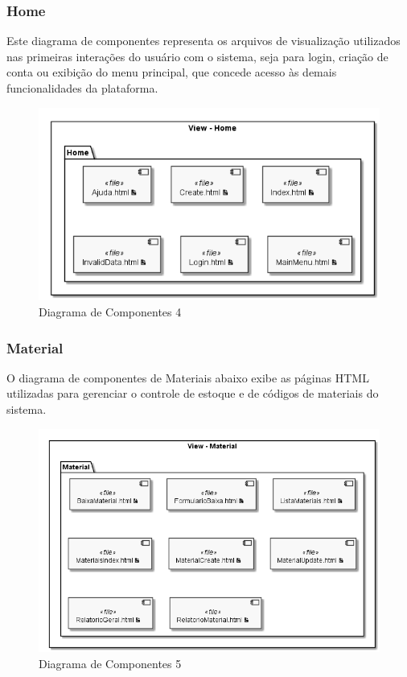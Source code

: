 \documentclass[rascunho,xindy,acronym,symbols]{fei}
\begin{document}
\subsubsection{Home}

Este diagrama de componentes representa os arquivos de visualização utilizados nas primeiras interações do usuário com o sistema, seja para login, criação de conta ou exibição do menu principal, que concede acesso às demais funcionalidades da plataforma.

\begin{figure}[H]
    \centering
    \includegraphics[scale=0.6, width=400pt]{./Images/Diagrama_de_Componentes_-_Home.png}
    \caption{Diagrama de Componentes 4}
    \label{fig:diag_componentes4}
\end{figure}

\subsubsection{Material}

O diagrama de componentes de Materiais abaixo exibe as páginas HTML utilizadas para gerenciar o controle de estoque e de códigos de materiais do sistema.

\begin{figure}[H]
    \centering
    \includegraphics[scale=0.6, width=400pt]{./Images/Diagrama_de_Componentes_-_Material.png}
    \caption{Diagrama de Componentes 5}
    \label{fig:diag_componentes5}
\end{figure}
\end{document}
